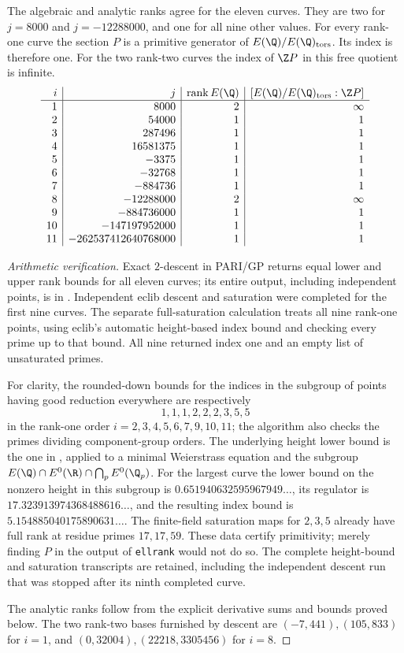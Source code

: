 \begin{statement}
The algebraic and analytic ranks agree for the eleven curves. They are
two for $j=8000$ and $j=-12288000$, and one for all nine other values.
For every rank-one curve the section $P$ is a primitive generator of
$E(\Q)/E(\Q)_{\rm tors}$. Its index is therefore one. For the two
rank-two curves the index of $\Z P$ in this free quotient is infinite.
\[
\begin{array}{r|r|r|r}
i&j&\operatorname{rank}E(\Q)&[E(\Q)/E(\Q)_{\rm tors}:\Z P]\\\hline
1&8000&2&\infty\\
2&54000&1&1\\
3&287496&1&1\\
4&16581375&1&1\\
5&-3375&1&1\\
6&-32768&1&1\\
7&-884736&1&1\\
8&-12288000&2&\infty\\
9&-884736000&1&1\\
10&-147197952000&1&1\\
11&-262537412640768000&1&1
\end{array}
\]
\end{statement}
\begin{proof}[Arithmetic verification]
Exact $2$-descent in PARI/GP returns equal lower and upper rank bounds
for all eleven curves; its entire output, including independent points,
is in . Independent eclib descent
and saturation were completed for the first nine curves. The separate
full-saturation calculation  treats
all nine rank-one points, using eclib's automatic height-based index
bound and checking every prime up to that bound. All nine returned
index one and an empty list of unsaturated primes.

For clarity, the rounded-down bounds for the indices in the subgroup
of points having good reduction everywhere are respectively
\[
 1,1,1,2,2,2,3,5,5
\]
in the rank-one order $i=2,3,4,5,6,7,9,10,11$; the algorithm also
checks the primes dividing component-group orders. The underlying
height lower bound is the one in
\citet[Theorem 1]{CrCremonaSiksek2006}, applied to a minimal
Weierstrass equation and the subgroup
$E(\Q)\cap E^0(\R)\cap\bigcap_pE^0(\Q_p)$.
For the largest curve the lower bound on the nonzero height in this
subgroup is $0.651940632595967949\ldots$, its regulator is
$17.323913974368488616\ldots$, and the resulting index bound is
$5.154885040175890631\ldots$. The finite-field saturation maps for
$2,3,5$ already have full rank at residue primes $17,17,59$.
These data certify primitivity; merely finding $P$ in the output of
\texttt{ellrank} would not do so. The complete height-bound and
saturation transcripts are retained, including the independent
descent run that was stopped after its ninth completed curve.

The analytic ranks follow from the explicit derivative sums and bounds
proved below. The two rank-two bases furnished by descent are
$(-7,441),(105,833)$ for $i=1$, and
$(0,32004),(22218,3305456)$ for $i=8$.
\end{proof}
